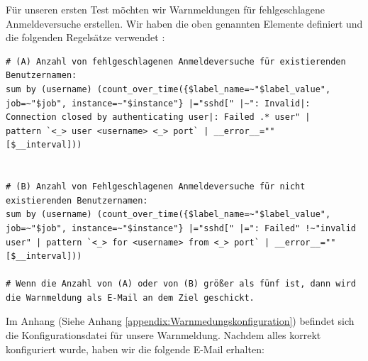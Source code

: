 Für unseren ersten Test möchten wir Warnmeldungen für fehlgeschlagene Anmeldeversuche erstellen. Wir haben die oben genannten Elemente definiert und die folgenden Regelsätze verwendet \citep{VoidQuark_sshlogs}:


{
\begin{Verbatim}[frame=single]
# (A) Anzahl von fehlgeschlagenen Anmeldeversuche für existierenden
Benutzernamen:
sum by (username) (count_over_time({$label_name=~"$label_value", 
job=~"$job", instance=~"$instance"} |="sshd[" |~": Invalid|: 
Connection closed by authenticating user|: Failed .* user" | 
pattern `<_> user <username> <_> port` | __error__="" 
[$__interval]))


# (B) Anzahl von Fehlgeschlagenen Anmeldeversuche für nicht 
existierenden Benutzernamen:
sum by (username) (count_over_time({$label_name=~"$label_value", 
job=~"$job", instance=~"$instance"} |="sshd[" |=": Failed" !~"invalid 
user" | pattern `<_> for <username> from <_> port` | __error__=""
[$__interval]))

# Wenn die Anzahl von (A) oder von (B) größer als fünf ist, dann wird
die Warnmeldung als E-Mail an dem Ziel geschickt.
\end{Verbatim}
}


Im Anhang (Siehe Anhang \ref{appendix:Warnmedungskonfiguration}) befindet sich die Konfigurationsdatei für unsere Warnmeldung. Nachdem alles korrekt konfiguriert wurde, haben wir die folgende E-Mail erhalten:


